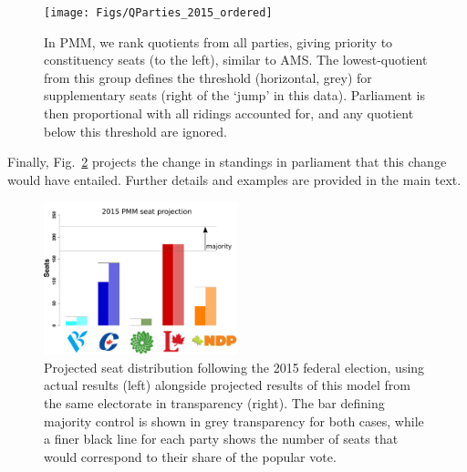 \documentclass[DIV=calc, paper=a4, fontsize=11pt, twocolumn]{scrartcl}	 %
\begin{document}
\begin{figure}[h!]
\texttt{[image: Figs/QParties\_2015\_ordered]}
\caption{ In PMM, we rank quotients from all parties, giving priority to constituency seats (to the left), similar to AMS. The lowest-quotient from this group defines the threshold (horizontal, grey) for supplementary seats (right of the `jump' in this data). Parliament is then proportional with all ridings accounted for, and any quotient below this threshold are ignored.}
\label{fig:sumQParties-2015-ordered}
\end{figure}

Finally, Fig.~\ref{fig:hypo_2015_sum} projects the change in standings in parliament that this change would have entailed. Further details and examples are provided in the main text.

\begin{figure}[h!]
  \includegraphics[width=0.50\textwidth,clip]{Figs/2015_seat_projection}
  \caption{Projected seat distribution following the 2015 federal election, using actual results (left) alongside projected results of this model from the same electorate in transparency (right). The bar defining majority control is shown in grey transparency for both cases, while a finer black line for each party shows the number of seats that would correspond to their share of the popular vote.}
\label{fig:hypo_2015_sum}
\end{figure}

\pagebreak

\maketitle %
\thispagestyle{fancy} %

\end{document}
